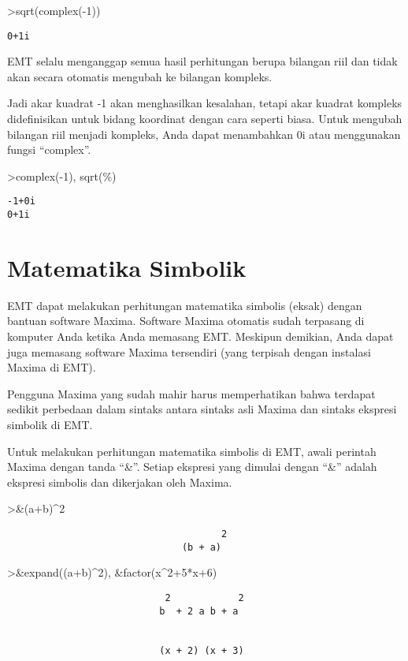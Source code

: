 \documentclass[
]{book}
\begin{document}
\textgreater sqrt(complex(-1))

\begin{verbatim}
0+1i
\end{verbatim}

EMT selalu menganggap semua hasil perhitungan berupa bilangan riil dan tidak akan secara otomatis mengubah ke bilangan kompleks.

Jadi akar kuadrat -1 akan menghasilkan kesalahan, tetapi akar kuadrat kompleks didefinisikan untuk bidang koordinat dengan cara seperti biasa. Untuk mengubah bilangan riil menjadi kompleks, Anda dapat menambahkan 0i atau menggunakan fungsi ``complex''.

\textgreater complex(-1), sqrt(\%)

\begin{verbatim}
-1+0i 
0+1i
\end{verbatim}

\chapter{Matematika Simbolik}\label{matematika-simbolik}

EMT dapat melakukan perhitungan matematika simbolis (eksak) dengan bantuan software Maxima. Software Maxima otomatis sudah terpasang di komputer Anda ketika Anda memasang EMT. Meskipun demikian, Anda dapat juga memasang software Maxima tersendiri (yang terpisah dengan instalasi Maxima di EMT).

Pengguna Maxima yang sudah mahir harus memperhatikan bahwa terdapat sedikit perbedaan dalam sintaks antara sintaks asli Maxima dan sintaks ekspresi simbolik di EMT.

Untuk melakukan perhitungan matematika simbolis di EMT, awali perintah Maxima dengan tanda ``\&''. Setiap ekspresi yang dimulai dengan ``\&'' adalah ekspresi simbolis dan dikerjakan oleh Maxima.

\textgreater\&(a+b)\^{}2

\begin{verbatim}
                                      2
                               (b + a)
\end{verbatim}

\textgreater\&expand((a+b)\^{}2), \&factor(x\^{}2+5*x+6)

\begin{verbatim}
                            2            2
                           b  + 2 a b + a


                           (x + 2) (x + 3)
\end{verbatim}
\end{document}
